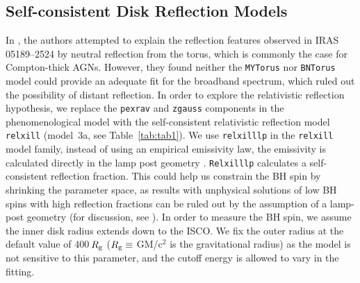 \documentclass[]{emulateapj}
\def \iras {{IRAS\,05189--2524 }}
\begin{document}
\subsection{Self-consistent Disk Reflection Models}
In \cite{ten15}, the authors attempted to explain the reflection features observed in \iras by neutral reflection from the torus, which is commonly the case for Compton-thick AGNs. However, they found neither the {\tt MYTorus} \citep{mur09} nor {\tt BNTorus} model \citep{bri11} could provide an adequate fit for the broadband spectrum, which ruled out the possibility of distant reflection. In order to explore the relativistic reflection hypothesis, we replace the {\tt pexrav} and {\tt zgauss} components in the phenomenological model with the self-consistent relativistic reflection model {\tt relxill} \citep{dau14, gar14} (model~3a, see Table~\ref{tab:tab1}). We use {\tt relxilllp} in the {\tt relxill} model family, instead of using an empirical emissivity law, the emissivity is calculated directly in the lamp post geometry \citep{dau13}. {\tt Relxilllp} calculates a self-consistent reflection fraction. This could help us constrain the BH spin by shrinking the parameter space, as results with unphysical solutions of low BH spins with high reflection fractions can be ruled out by the assumption of a lamp-post geometry (for discussion, see \citealt{dau14}). In order to measure the BH spin, we assume the inner disk radius extends down to the ISCO. We fix the outer radius at the default value of 400\,$R_{\rm g}$ ($R_{\rm g} \equiv$ GM/c$^{2}$ is the gravitational radius) as the model is not sensitive to this parameter, and the cutoff energy is allowed to vary in the fitting.
\end{document}
